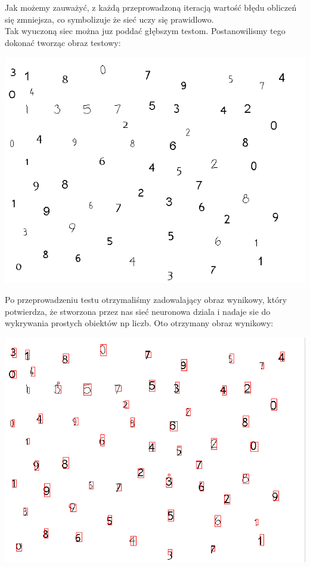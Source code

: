 \documentclass[11pt,a4paper]{article}
\begin{document}
Jak możemy zauważyć, z każdą przeprowadzoną iteracją wartość błędu obliczeń się zmniejsza, 
co symbolizuje że sieć uczy się prawidlowo.\\
Tak wyuczoną siec można juz poddać głębszym testom. Postanowilismy tego dokonać tworząc obraz testowy:

\hspace*{4cm}
\includegraphics[scale=0.4]{test1}
\hspace*{3cm}
\vspace*{0.5cm}

Po przeprowadzeniu testu otrzymaliśmy zadowalający obraz wynikowy, który potwierdza, że stworzona przez nas 
sieć neuronowa dziala i nadaje sie do wykrywania prostych obiektów np liczb.
Oto otrzymany obraz wynikowy:

\vspace*{0.5cm}
\hspace*{4cm}
\includegraphics[scale=0.4]{wynik}
\hspace*{3cm}
\vspace*{0,5cm}
\end{document}
